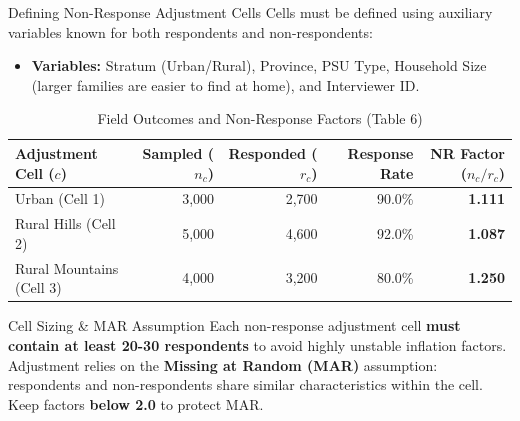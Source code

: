 \documentclass[10pt, aspectratio=169]{beamer}
\begin{document}
\begin{frame}{Defining Non-Response Adjustment Cells}
  Cells must be defined using auxiliary variables known for both respondents and non-respondents:
  \begin{itemize}
    \item \textbf{Variables:} Stratum (Urban/Rural), Province, PSU Type, Household Size (larger families are easier to find at home), and Interviewer ID.
  \end{itemize}

  \begin{table}
    \centering
    \footnotesize
    \begin{tabular}{lrrrr}
      \toprule
      \textbf{Adjustment Cell ($c$)} & \textbf{Sampled ($n_c$)} & \textbf{Responded ($r_c$)} & \textbf{Response Rate} & \textbf{NR Factor ($n_c/r_c$)} \\
      \midrule
      Urban (Cell 1) & 3,000 & 2,700 & 90.0\% & \textbf{1.111} \\
      Rural Hills (Cell 2) & 5,000 & 4,600 & 92.0\% & \textbf{1.087} \\
      Rural Mountains (Cell 3) & 4,000 & 3,200 & 80.0\% & \textbf{1.250} \\
      \bottomrule
    \end{tabular}
    \caption{Field Outcomes and Non-Response Factors (Table 6)}
  \end{table}

  \begin{alertblock}{Cell Sizing \& MAR Assumption}
    Each non-response adjustment cell \textbf{must contain at least 20-30 respondents} to avoid highly unstable inflation factors. Adjustment relies on the \textbf{Missing at Random (MAR)} assumption: respondents and non-respondents share similar characteristics within the cell. Keep factors \textbf{below 2.0} to protect MAR.
  \end{alertblock}
\end{frame}
\end{document}
